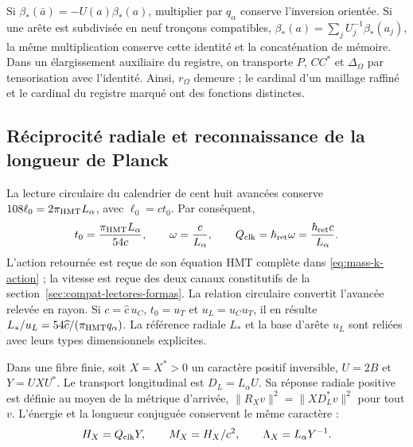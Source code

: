 Si \(\beta_*(\bar a)=-U(a)\beta_*(a)\), multiplier par
\(q_\alpha\) conserve l’inversion orientée. Si une arête est
subdivisée en neuf tronçons compatibles,
\(\beta_*(a)=\sum_jU_j^{-1}\beta_*(a_j)\), la même
multiplication conserve cette identité et la concaténation de mémoire.
Dans un élargissement auxiliaire du registre, on transporte
\(P\), \(CC^*\) et \(\Delta_\Omega\) par tensorisation
avec l’identité. Ainsi, \(r_\Omega\) demeure ; le cardinal d’un
maillage raffiné et le cardinal du registre marqué ont des fonctions
distinctes.

\subsection{Réciprocité radiale et reconnaissance de la longueur de Planck}
\label{rev5:radial}

La lecture circulaire du calendrier de cent huit avancées conserve
\(108\ell_0=2\pi_{\rm HMT}L_\alpha\), avec
\(\ell_0=ct_0\). Par conséquent,
\begin{equation}
 t_0=\frac{\pi_{\rm HMT}L_\alpha}{54c},\qquad
 \omega=\frac{c}{L_\alpha},\qquad
 Q_{\rm clk}=\hbar_{\rm ret}\omega
 =\frac{\hbar_{\rm ret}c}{L_\alpha}.
 \label{rev5:reloj}
\end{equation}
L’action retournée est reçue de son équation HMT complète dans
\eqref{eq:mass-k-action} ; la vitesse est reçue des deux canaux
constitutifs de la section~\ref{sec:compat-lectores-formas}.
La relation circulaire convertit l’avancée relevée en rayon. Si
\(c=\widehat c\,u_C\), \(t_0=u_T\) et
\(u_L=u_Cu_T\), il en résulte
\(L_*/u_L=54\widehat c/(\pi_{\rm HMT}q_\alpha)\).
La référence radiale \(L_*\) et la base d’arête \(u_L\)
sont reliées avec leurs types dimensionnels explicites.

Dans une fibre finie, soit \(X=X^*>0\) un caractère positif inversible, \(U=2B\) et \(Y=UXU^*\). Le transport longitudinal est \(D_L=L_\alpha U\). Sa réponse radiale positive est définie au moyen de la métrique d'arrivée, \(\|R_Xv\|^2=\|XD_L^*v\|^2\) pour tout \(v\). L'énergie et la longueur conjuguée conservent le même caractère :
\[
 H_X=Q_{\rm clk}Y,\qquad M_X=H_X/c^2,\qquad
 \Lambda_X=L_\alpha Y^{-1}.
\]

